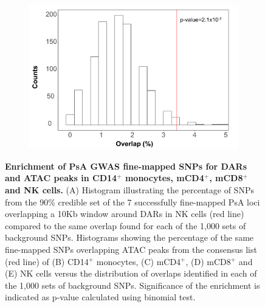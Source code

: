 \begin{figure}[htbp]
\begin{subfigure}[b]{0.40\textwidth}
\includegraphics[width=\textwidth]{./Results3/pdfs/PsA_FM_enrichment_for_NK_consensus_ATAC_peaks_inside}
\caption{}
\end{subfigure}
\caption[Enrichment of PsA GWAS fine-mapped SNPs for DARs and ATAC peaks in CD14$^+$ monocytes, mCD4$^+$, mCD8$^+$ and NK cells.]{\textbf{Enrichment of PsA GWAS fine-mapped SNPs for DARs and ATAC peaks in CD14$^+$ monocytes, mCD4$^+$, mCD8$^+$ and NK cells.} (A) Histogram illustrating the percentage of SNPs from the 90\% credible set of the 7 successfully fine-mapped PsA loci overlapping a 10Kb window around DARs in NK cells (red line) compared to the same overlap found for each of the 1,000 sets of background SNPs. Histograms showing the percentage of the same fine-mapped SNPs overlapping ATAC peaks from the consensus list (red line) of (B) CD14$^+$ monocytes, (C) mCD4$^+$, (D) mCD8$^+$ and (E) NK cells versus the distribution of overlaps identified in each of the 1,000 sets of background SNPs. Significance of the enrichment is indicated as p-value calculated using binomial test.}
\label{figure:PsA_FM_enrichment_analysis_ATAC}
\end{figure}


